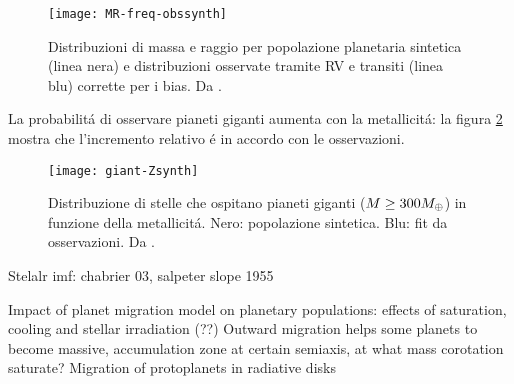 \begin{figure}[!ht]\texttt{[image: MR-freq-obssynth]}\caption{Distribuzioni di massa e raggio per popolazione planetaria sintetica (linea nera) e distribuzioni osservate tramite RV e transiti (linea blu) corrette per i bias. Da \cite{mordasini2018planetary}.}\label{fig:MR-freq-obssynth}\end{figure}

La probabilit\'a di osservare pianeti giganti aumenta con la metallicit\'a: la figura \ref{fig:giant-Zsynth} mostra che l'incremento relativo \'e in accordo con le osservazioni.

\begin{figure}[!ht]
\texttt{[image: giant-Zsynth]}
\caption{Distribuzione di stelle che ospitano pianeti giganti ($M\geq300M_{\oplus}{}$) in funzione della metallicit\'a. Nero: popolazione sintetica. Blu: fit da osservazioni. Da \cite{mordasini2018planetary}. }\label{fig:giant-Zsynth}
\end{figure}

\begin{workout}

\end{workout}

\begin{workout}
Stelalr imf: chabrier 03, salpeter slope 1955
\end{workout}




\begin{workout}
Impact of planet migration model on planetary populations: effects of saturation, cooling and stellar irradiation (??)
Outward migration helps some planets to become massive, accumulation zone at certain semiaxis, at what mass corotation saturate?
Migration of protoplanets in radiative disks
\end{workout}
